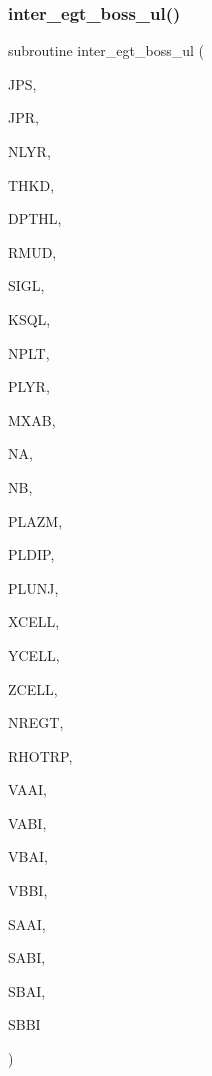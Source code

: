 \subsubsection{\texorpdfstring{inter\+\_\+egt\+\_\+boss\+\_\+ul()}{inter\_egt\_boss\_ul()}}
{\footnotesize\ttfamily subroutine inter\+\_\+egt\+\_\+boss\+\_\+ul (\begin{DoxyParamCaption}\item[{integer}]{J\+PS,  }\item[{integer}]{J\+PR,  }\item[{integer}]{N\+L\+YR,  }\item[{real (kind=ql), dimension(nlyr)}]{T\+H\+KD,  }\item[{real (kind=ql), dimension(nlyr)}]{D\+P\+T\+HL,  }\item[{real (kind=ql), dimension(0\+:nlyr)}]{R\+M\+UD,  }\item[{complex(kind=ql), dimension(nlyr)}]{S\+I\+GL,  }\item[{complex(kind=ql), dimension(nlyr)}]{K\+S\+QL,  }\item[{integer}]{N\+P\+LT,  }\item[{integer, dimension (nplt)}]{P\+L\+YR,  }\item[{integer}]{M\+X\+AB,  }\item[{integer, dimension (nplt)}]{NA,  }\item[{integer, dimension (nplt)}]{NB,  }\item[{real, dimension (nplt)}]{P\+L\+A\+ZM,  }\item[{real, dimension (nplt)}]{P\+L\+D\+IP,  }\item[{real, dimension (nplt)}]{P\+L\+U\+NJ,  }\item[{real, dimension(mxab,nplt)}]{X\+C\+E\+LL,  }\item[{real, dimension(mxab,nplt)}]{Y\+C\+E\+LL,  }\item[{real, dimension(mxab,nplt)}]{Z\+C\+E\+LL,  }\item[{integer}]{N\+R\+E\+GT,  }\item[{real, dimension(nregt)}]{R\+H\+O\+T\+RP,  }\item[{complex, dimension(mxab,mxab)}]{V\+A\+AI,  }\item[{complex, dimension(mxab,mxab)}]{V\+A\+BI,  }\item[{complex, dimension(mxab,mxab)}]{V\+B\+AI,  }\item[{complex, dimension(mxab,mxab)}]{V\+B\+BI,  }\item[{complex, dimension(mxab,mxab)}]{S\+A\+AI,  }\item[{complex, dimension(mxab,mxab)}]{S\+A\+BI,  }\item[{complex, dimension(mxab,mxab)}]{S\+B\+AI,  }\item[{complex, dimension(mxab,mxab)}]{S\+B\+BI }\end{DoxyParamCaption})}


